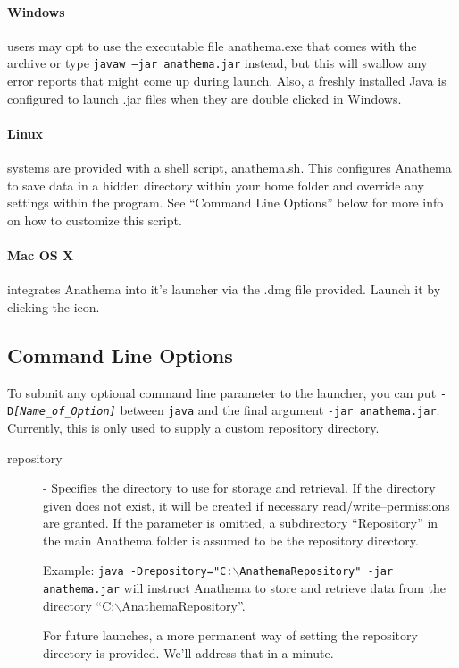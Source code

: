 \paragraph{Windows} users may opt to use the executable file anathema.exe that comes with the archive or type \texttt{javaw --jar anathema.jar} instead, but this will swallow any error reports that might come up during launch. Also, a freshly installed Java is configured to launch .jar files when they are double clicked in Windows.

\paragraph{Linux} systems are provided with a shell script, anathema.sh. This configures Anathema to save data in a hidden directory within your home folder and override any settings within the program. See ``Command Line Options'' below for more info on how to customize this script.

\paragraph{Mac OS X} integrates Anathema into it's launcher via the .dmg file provided. Launch it by clicking the icon.
  
\subsection{Command Line Options}
To submit any optional command line parameter to the launcher, you can put \linebreak
\texttt{-D\emph{[Name\_of\_Option]}} between \texttt{java} and the final argument \texttt{-jar anathema.jar}. Currently, this is only used to supply a custom repository directory.

\begin{description}
\item[repository] - Specifies the directory to use for storage and retrieval. If the directory given does not exist, it will be created if necessary read/write--permissions are granted. If the parameter is omitted, a subdirectory ``Repository'' in the main Anathema folder is assumed to be the repository directory.

	Example:\newline
	\texttt{java -Drepository="C:$\backslash$AnathemaRepository" -jar anathema.jar} will instruct Anathema to store and retrieve data from the directory 
	\linebreak``C:$\backslash$AnathemaRepository''.
	
For future launches, a more permanent way of setting the repository directory is provided. We'll address that in a minute.
\end{description}

